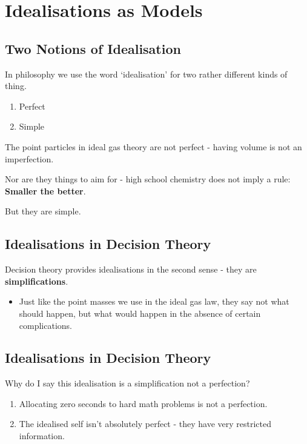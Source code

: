 \documentclass[
  letterpaper,
  DIV=11,
  numbers=noendperiod]{scrartcl}
\providecommand{\tightlist}{%
  \setlength{\itemsep}{0pt}\setlength{\parskip}{0pt}}\usepackage{longtable,booktabs,array}
\begin{document}
\section{Idealisations as Models}\label{idealisations-as-models}

\subsection{Two Notions of
Idealisation}\label{two-notions-of-idealisation}

In philosophy we use the word `idealisation' for two rather different
kinds of thing.

\begin{enumerate}
\def\labelenumi{\arabic{enumi}.}
\tightlist
\item
  Perfect
\item
  Simple
\end{enumerate}

The point particles in ideal gas theory are not perfect - having volume
is not an imperfection.

Nor are they things to aim for - high school chemistry does not imply a
rule: \textbf{Smaller the better}.

But they are simple.

\subsection{Idealisations in Decision
Theory}\label{idealisations-in-decision-theory}

Decision theory provides idealisations in the second sense - they are
\textbf{simplifications}.

\begin{itemize}
\tightlist
\item
  Just like the point masses we use in the ideal gas law, they say not
  what should happen, but what would happen in the absence of certain
  complications.
\end{itemize}

\subsection{Idealisations in Decision
Theory}\label{idealisations-in-decision-theory-1}

Why do I say this idealisation is a simplification not a perfection?

\begin{enumerate}
\def\labelenumi{\arabic{enumi}.}
\tightlist
\item
  Allocating zero seconds to hard math problems is not a perfection.
\item
  The idealised self isn't absolutely perfect - they have very
  restricted information.
\end{enumerate}
\end{document}

